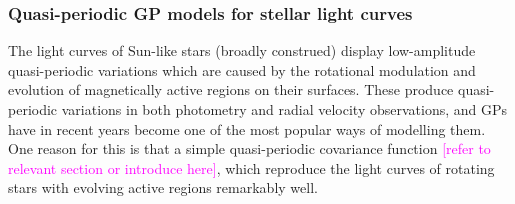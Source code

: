 \documentclass[letterpaper]{ar-1col}
\newcommand{\suz}[1]{\textcolor{magenta}{#1}}
\begin{document}
\subsubsection{Quasi-periodic GP models for stellar light curves}

The light curves of Sun-like stars (broadly construed) display low-amplitude quasi-periodic variations which are caused by the rotational modulation and evolution of magnetically active regions on their surfaces. These produce quasi-periodic variations in both photometry and radial velocity observations, and GPs have in recent years become one of the most popular ways of modelling them. One reason for this is that a simple quasi-periodic covariance function  \suz{[refer to relevant section or introduce here]}, which reproduce the light curves of rotating stars with evolving active regions remarkably well. 

\end{document}

